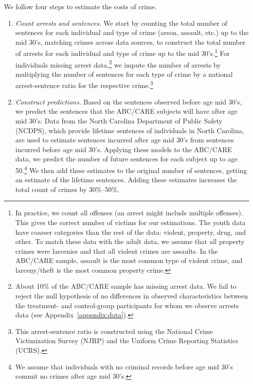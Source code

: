 We follow four steps to estimate the costs of crime.

\begin{enumerate}
\item \textit{Count arrests and sentences.} We start by counting the total number of sentences for each individual and type of crime (arson, assault, etc.) up to the mid 30's, matching crimes across data sources, to construct the total number of  arrests for each individual and type of crime up to the mid 30's.\footnote{In practice, we count all offenses (an arrest might include multiple offenses). This gives the correct number of victims for our estimations. The youth data have coarser categories than the rest of the data: violent, property, drug, and other. To match these data with the adult data, we assume that all property crimes were larcenies and that all violent crimes are assaults. In the ABC/CARE sample, assault is the most common type of violent crime, and larceny/theft is the most common property crime.} For individuals missing arrest data,\footnote{About 10\% of the ABC/CARE sample has missing arrest data. We fail to reject the null hypothesis of no differences in observed characteristics between the treatment- and control-group participants for whom we observe arrests data (see  Appendix~\ref{appendix:data}).} we impute the number of arrests by multiplying the number of sentences for each type of crime by a national arrest-sentence ratio for the respective crime.\footnote{This arrest-sentence ratio is constructed using the National Crime Victimization Survey (NJRP) and the Uniform Crime Reporting Statistics (UCRS).}

\item \textit{Construct predictions.} Based on the sentences observed before age mid 30's, we predict the sentences that the ABC/CARE subjects will have after age mid 30's. Data from the North Carolina Department of Public Safety (NCDPS), which provide lifetime sentences of individuals in North Carolina, are used to estimate sentences incurred after age mid 30's from sentences incurred before age mid 30's. Applying these models to the ABC/CARE data, we predict the number of future sentences for each subject up to age 50.\footnote{We assume that individuals with no criminal records before age mid 30's commit no crimes after age mid 30's.} We then add these estimates to the original number of sentences, getting an estimate of the lifetime sentences. Adding these estimates increases the total count of crimes by 30\%--50\%.


\end{enumerate}
